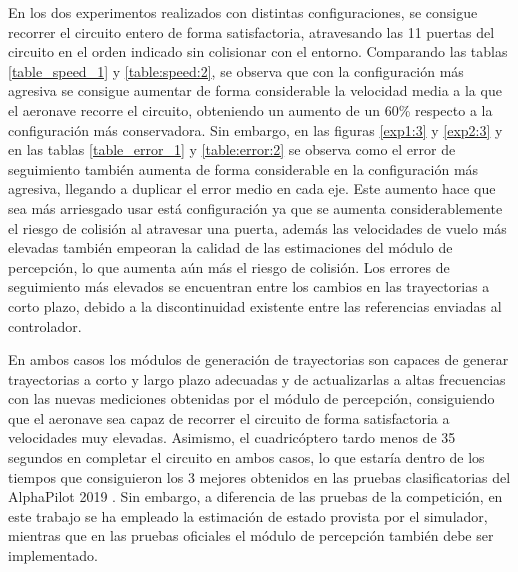 En los dos experimentos realizados con distintas configuraciones, se consigue recorrer el circuito entero de forma satisfactoria, atravesando las 11 puertas del circuito en el orden indicado sin colisionar con el entorno. Comparando las tablas \ref{table_speed_1} y \ref{table:speed:2}, se observa que con la configuración más agresiva se consigue aumentar de forma considerable la velocidad media a la que el aeronave recorre el circuito, obteniendo un aumento de un 60\% respecto a la configuración más conservadora. Sin embargo, en las figuras \ref{exp1:3} y \ref{exp2:3}  y en las tablas \ref{table_error_1} y \ref{table:error:2} se observa como el error de seguimiento también aumenta de forma considerable en la configuración más agresiva, llegando a duplicar el error medio en cada eje. Este aumento hace que sea más arriesgado usar está configuración ya que se aumenta considerablemente el riesgo de colisión al atravesar una puerta, además las velocidades de vuelo más elevadas también empeoran la calidad de las estimaciones del módulo de percepción, lo que aumenta aún más el riesgo de colisión. Los errores de seguimiento más elevados se encuentran entre los cambios en las trayectorias a corto plazo, debido a la discontinuidad existente entre las referencias enviadas al controlador.

En ambos casos los módulos de generación de trayectorias son capaces de generar trayectorias a corto y largo plazo adecuadas y de actualizarlas a altas frecuencias con las nuevas mediciones obtenidas por el módulo de percepción, consiguiendo que el aeronave sea capaz de recorrer el circuito de forma satisfactoria a velocidades muy elevadas.
Asimismo, el cuadricóptero tardo menos de 35 segundos en completar el circuito en ambos casos, lo que estaría dentro de los tiempos que consiguieron los 3 mejores obtenidos en las pruebas clasificatorias del AlphaPilot 2019 \cite{guerra2019flightgoggles}. Sin embargo, a diferencia de las pruebas de la competición, en este trabajo se ha empleado la estimación de estado provista por el simulador, mientras que en las pruebas oficiales el módulo de percepción también debe ser implementado. 





